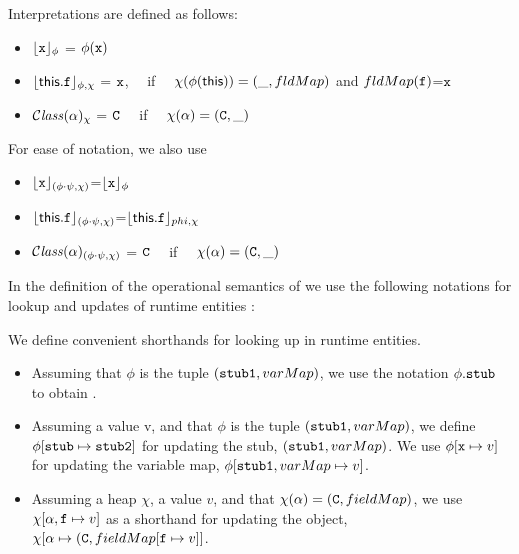 \begin{definition}[Interpretations]
Interpretations are defined as follows:

\begin{itemize}
\item 
${\lfloor{ {{\mbox{\tt{x}}}}}\rfloor_{\phi}} $ = $\phi({\mbox{\tt{x}}})$  
\item
${\lfloor{ {{\bf{\sf {this}}}.{\mbox{\tt{f}}}}}\rfloor_{\phi,\chi}} $ =  ${\mbox{\tt{x}}}$, \ \ if \ \ $\chi(\phi({\bf{\sf {this}}}))=(\_, fldMap)$ and $fldMap({\mbox{\tt{f}}})$=${\mbox{\tt{x}}}$ 
\item
${\mathcal C}{\mathit{lass}}(\alpha)_{\chi} $ = ${\mbox{\tt{C}}}$ \ \ if \ \ $\chi(\alpha)=({\mbox{\tt{C}}},\_)$ 

\end{itemize}

\noindent
For ease of notation, we also use
\begin{itemize}
\item
${\lfloor{ {{\mbox{\tt{x}}}}}\rfloor_{(\phi\cdot\psi,\chi)}} $=${\lfloor{ {{\mbox{\tt{x}}}}}\rfloor_{\phi}} $
\item
${\lfloor{ {{\bf{\sf {this}}}.{\mbox{\tt{f}}}}}\rfloor_{(\phi\cdot\psi,\chi)}} $=${\lfloor{ {{\bf{\sf {this}}}.{\mbox{\tt{f}}}}}\rfloor_{phi,\chi}} $
\item
${\mathcal C}{\mathit{lass}}(\alpha)_{(\phi\cdot\psi,\chi)} $ = ${\mbox{\tt{C}}}$ \ \ if \ \ $\chi(\alpha)=({\mbox{\tt{C}}},\_)$ 
\end{itemize}

\end{definition}

In the definition of the operational semantics of \LangOO we use the following notations for lookup and updates of runtime entities : 

\begin{definition}
We define convenient shorthands for looking up in  runtime entities. 
\begin{itemize}
\item
Assuming that $\phi$ is the tuple  $({\mbox{\tt{stub1}}}, varMap)$, we use the notation  $\phi.{\mbox{\tt{stub}}}$ to obtain .
\item
Assuming a value v, and that $\phi$ is the tuple  $({\mbox{\tt{stub1}}}, varMap)$, we define $\phi[{\mbox{\tt{stub}}}\mapsto{\mbox{\tt{stub2}}}]$ for updating the stub, \ie   
$({\mbox{\tt{stub1}}}, varMap)$.   We use  $\phi[{\mbox{\tt{x}}} \mapsto v]$  for updating the variable map, \ie  $\phi[{\mbox{\tt{stub1}}}, varMap\mapsto v]$.
\item
Assuming a heap $\chi$, a value $v$, and   that $\chi(\alpha)=({\mbox{\tt{C}}}, fieldMap)$,
we use $\chi[\alpha,{\mbox{\tt{f}}} \mapsto v]$ as a shorthand for updating the object, \ie $\chi[\alpha \mapsto ({\mbox{\tt{C}}}, fieldMap[{\mbox{\tt{f}}} \mapsto v]]$.
\end{itemize}

\end{definition}






